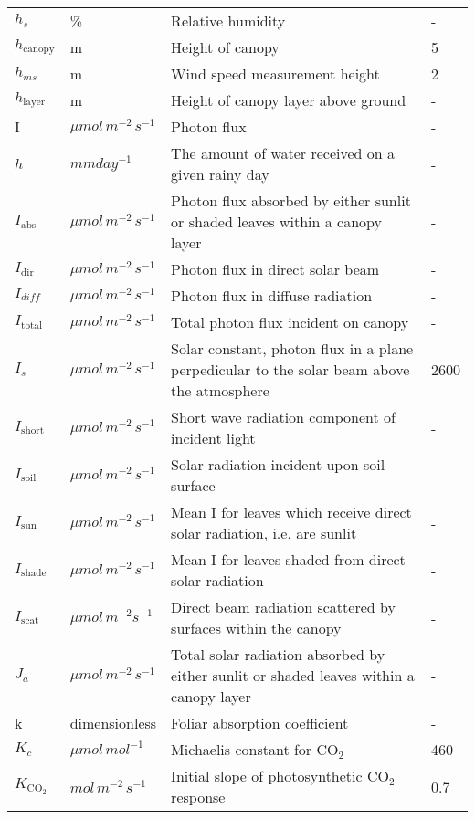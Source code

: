 \documentclass[12pt]{report}
\begin{document}
\begin{center}
\begin{longtable}{l l p{3in} p{0.5in}}
$h_s$	&	\%	&	Relative humidity	&	-	\\
$h_{\text{canopy}}$	&	m	&	Height of canopy	&	5	\\
$h_{ms}$	&	m	&	Wind speed measurement height	&	2	\\
$h_{\text{layer}}$	&	m	&	Height of canopy layer above ground	&	-	\\
	I&	$\mu mol\, m^{-2}\, s^{-1}$ 	&	Photon flux	&	-	\\
$h$	&	$mm day^{-1}$	&	The amount of water received on a given rainy day	&	-	\\
$I_{\text{abs}}$	&	$\mu mol\, m^{-2}\, s^{-1}$ 	&	Photon flux absorbed by either sunlit or shaded leaves within a canopy layer	&	-	\\
$I_{\text{dir}}$	&	$\mu mol\, m^{-2}\, s^{-1}$ 	&	Photon flux in direct solar beam	&	-	\\
$I_{\mathit{\text{diff}}}$	&	$\mu mol\,m^{-2}\, s^{-1}$ 	&	Photon flux in diffuse radiation	&	-	\\
$I_{\text{total}}$	&	$\mu mol\, m^{-2}\, s^{-1}$ 	&	Total photon flux incident on canopy	&	-	\\
$I_s$	&	$\mu mol\, m^{-2}\, s^{-1}$ 	&	Solar constant, photon flux in a plane perpedicular to the solar beam above the atmosphere	&	2600	\\
$I_{\text{short}}$	&	$\mu mol\, m^{-2}\, s^{-1}$ 	&	Short wave radiation component of incident light	&	-	\\
$I_{\text{soil}}$	&	$\mu mol\, m^{-2}\, s^{-1}$ 	&	Solar radiation incident upon soil surface	&	-	\\
$I_{\text{sun}}$	&	$\mu mol\, m^{-2}\, s^{-1}$ 	&	Mean I for leaves which receive direct solar radiation, i.e. are sunlit	&	-	\\
$I_{\text{shade}}$	&	$\mu mol\, m^{-2}\, s^{-1}$ 	&	Mean I for leaves shaded from direct solar radiation	&	-	\\
$I_{\text{scat}}$	&	$\mu mol\, m^{-2} s^{-1}$ 	&	Direct beam radiation scattered by surfaces within the canopy	&	-	\\
$J_{a}$	&	$\mu mol\, m^{-2}\, s^{-1}$ 	&	Total solar radiation absorbed by either sunlit or shaded leaves within a canopy layer	&	-	\\
	k&	dimensionless	&	Foliar absorption coefficient	&	-	\\
$K_c$	&	$\mu mol\, mol^{-1}$ 	&	Michaelis constant for CO$_2$	&	460	\\
$K_{\text{CO}_2}$  	&	$mol\, m^{-2}\, s^{-1}$ 	&	Initial slope of photosynthetic CO$_2$ response	&	0.7	\\

\end{longtable}
\end{center}
\end{document}
